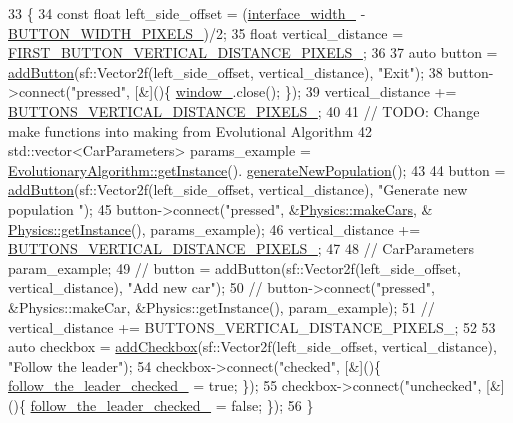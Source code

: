 \begin{DoxyCode}
33                                         \{
34     \textcolor{keyword}{const} \textcolor{keywordtype}{float} left\_side\_offset = (\hyperlink{classGraphicalUserInterface_ae3c07ea59e557909f92882028fafb0a3}{interface\_width\_} - 
      \hyperlink{classGraphicalUserInterface_a90c125308f85a684fa6e609d474f4550}{BUTTON\_WIDTH\_PIXELS\_})/2;
35     \textcolor{keywordtype}{float} vertical\_distance = \hyperlink{classGraphicalUserInterface_a6448ea8aab0807628a01487db52f76c2}{FIRST\_BUTTON\_VERTICAL\_DISTANCE\_PIXELS\_};
36 
37     \textcolor{keyword}{auto} button = \hyperlink{classGraphicalUserInterface_a91abd8446fe18cee7ff63a541a79da56}{addButton}(sf::Vector2f(left\_side\_offset, vertical\_distance), \textcolor{stringliteral}{"Exit"});
38     button->connect(\textcolor{stringliteral}{"pressed"}, [&]()\{ \hyperlink{classGraphicalUserInterface_ae51adeb759a97196eda3b37bfc80a452}{window\_}.close(); \});
39     vertical\_distance += \hyperlink{classGraphicalUserInterface_aa5dd4f194d311d5b2dd3690ed0bad8ec}{BUTTONS\_VERTICAL\_DISTANCE\_PIXELS\_};
40 
41     \textcolor{comment}{// TODO: Change make functions into making from Evolutional Algorithm}
42     std::vector<CarParameters> params\_example = 
      \hyperlink{classEvolutionaryAlgorithm_a306ea15ca9a4eb67b84d22c7b24ef659}{EvolutionaryAlgorithm::getInstance}().
      \hyperlink{classEvolutionaryAlgorithm_aad3e66c5d020fdcf1cb1e5ade0f01385}{generateNewPopulation}();
43 
44     button = \hyperlink{classGraphicalUserInterface_a91abd8446fe18cee7ff63a541a79da56}{addButton}(sf::Vector2f(left\_side\_offset, vertical\_distance), \textcolor{stringliteral}{"Generate new population
      "});
45     button->connect(\textcolor{stringliteral}{"pressed"}, &\hyperlink{classPhysics_a0c2c8ee78b42f9727d420f2fbb624e5a}{Physics::makeCars}, &
      \hyperlink{classPhysics_ab0590d6f12821b4e4a3ef894663704a1}{Physics::getInstance}(), params\_example);
46     vertical\_distance += \hyperlink{classGraphicalUserInterface_aa5dd4f194d311d5b2dd3690ed0bad8ec}{BUTTONS\_VERTICAL\_DISTANCE\_PIXELS\_};
47 
48 \textcolor{comment}{//    CarParameters param\_example;}
49 \textcolor{comment}{//    button = addButton(sf::Vector2f(left\_side\_offset, vertical\_distance), "Add new car");}
50 \textcolor{comment}{//    button->connect("pressed", &Physics::makeCar, &Physics::getInstance(), param\_example);}
51 \textcolor{comment}{//    vertical\_distance += BUTTONS\_VERTICAL\_DISTANCE\_PIXELS\_;}
52 
53     \textcolor{keyword}{auto} checkbox = \hyperlink{classGraphicalUserInterface_ac7094ec5d8ec8edd7325072f97f8de59}{addCheckbox}(sf::Vector2f(left\_side\_offset, vertical\_distance), \textcolor{stringliteral}{"Follow the
       leader"});
54     checkbox->connect(\textcolor{stringliteral}{"checked"}, [&]()\{ \hyperlink{classGraphicalUserInterface_a57fe5ef98f53a222aab96d191e869ad3}{follow\_the\_leader\_checked\_} = \textcolor{keyword}{true}; \});
55     checkbox->connect(\textcolor{stringliteral}{"unchecked"}, [&]()\{ \hyperlink{classGraphicalUserInterface_a57fe5ef98f53a222aab96d191e869ad3}{follow\_the\_leader\_checked\_} = \textcolor{keyword}{false}; \});
56 \}
\end{DoxyCode}
